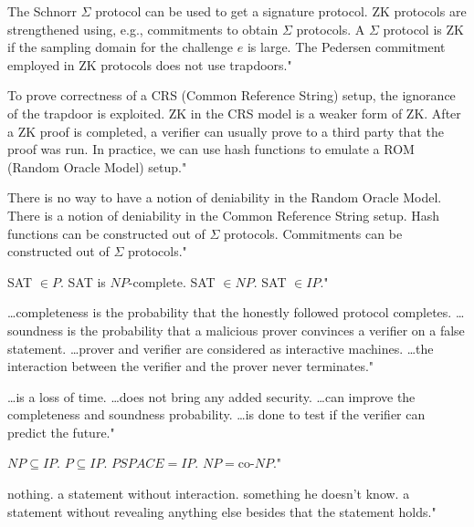 {The Schnorr $\Sigma$ protocol can be used to get a signature protocol.}
{ZK protocols are strengthened using, e.g., commitments to obtain $\Sigma$ protocols.}
{A $\Sigma$ protocol is ZK if the sampling domain for the challenge $e$ is large.}
{The Pedersen commitment employed in ZK protocols does not use trapdoors."}

{To prove correctness of a CRS (Common Reference String) setup, the ignorance of the trapdoor is exploited.}
{ZK in the CRS model is a weaker form of ZK.}
{After a ZK proof is completed, a verifier can usually prove to a third party that the proof was run.}
{In practice, we can use hash functions to emulate a ROM (Random Oracle Model) setup."}

{There is no way to have a notion of deniability in the Random Oracle Model.}
{There is a notion of deniability in the Common Reference String setup.}
{Hash functions can be constructed out of $\Sigma$ protocols.}
{Commitments can be constructed out of $\Sigma$ protocols."}

{SAT $\in P$.}
{SAT is $NP$-complete.}
{SAT $\in NP$.}
{SAT $\in IP$."}

{\ldots completeness is the probability that the honestly followed protocol completes.}
{\ldots soundness is the probability that a malicious prover convinces a verifier on a false statement.}
{\ldots prover and verifier are considered as interactive machines.}
{\ldots the interaction between the verifier and the prover never terminates."}

{\ldots is a loss of time.}
{\ldots does not bring any added security.}
{\ldots can improve the completeness and soundness probability.}
{\ldots is done to test if the verifier can predict the future."}

{$NP\subseteq IP$.}
{$P\subseteq IP$.}
{$PSPACE=IP$.}
{$NP = \text{co-}NP$."}

{nothing.}
{a statement without interaction.}
{something he doesn't know.}
{a statement without revealing anything else besides that the statement holds."}

